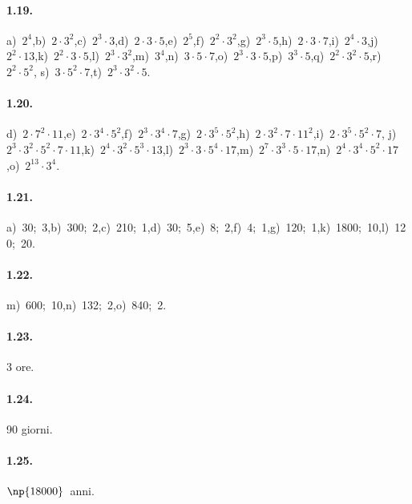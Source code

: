 \paragraph{1.19.}
a)~$2^4$,\quad b)~$ 2\cdot 3^2 $,\quad c)~$ 2^3 \cdot 3 $,\quad d)~$ 2\cdot 3\cdot 5 $,\quad e)~$ 2^5 $,\quad f)~$ 2^2 \cdot 3^2 $,\quad g)~$ 2^3 \cdot 5 $,\quad h)~$ 2\cdot 3\cdot 7 $,\quad i)~$ 2^4 \cdot 3 $,\quad j)~$ 2^2 \cdot 13 $,\quad k)~$ 2^2 \cdot 3 \cdot5 $,\quad l)~$ 2^3 \cdot 3^2 $,\quad m)~$ 3^4 $,\quad n)~$ 3\cdot 5\cdot 7 $,\quad o)~$ 2^3 \cdot 3\cdot 5 $,\quad p)~$ 3^3 \cdot 5 $,\quad q)~$ 2^2 \cdot 3^2 \cdot 5 $,\quad r)~$ 2^2 \cdot 5^2 $, s)~$3\cdot5^2\cdot7$,\quad t)~$ 2^3 \cdot 3^2 \cdot5$.

\paragraph{1.20.}
d)~$2\cdot7^2\cdot11$,\quad e)~$2\cdot3^4\cdot5^2$,\quad f)~$2^3\cdot3^4\cdot7$,\quad g)~$2\cdot3^5\cdot5^2$,\quad h)~$2\cdot3^2\cdot7\cdot11^2$,\quad i)~$2\cdot3^5\cdot5^2\cdot7$,\quad
j)~$2^3\cdot3^2\cdot5^2\cdot7\cdot11$,\quad k)~$2^4\cdot3^2\cdot5^3\cdot13$,\quad l)~$2^3\cdot3\cdot5^4\cdot17$,\quad m)~$2^7\cdot3^3\cdot5\cdot17$,\quad n)~$2^4\cdot3^4\cdot5^2\cdot17$,\quad o)~$2^{13}\cdot3^4$.

\paragraph{1.21.}
a)~30;~3,\quad b)~300;~2,\quad c)~210;~1,\quad d)~30;~5,\quad e)~8;~2,\quad f)~4;~1,\quad g)~120;~1,\quad k)~1800;~10,\quad l)~120;~20.

\paragraph{1.22.}
m)~600;~10,\quad n)~132;~2,\quad o)~840;~2.

\begin{multicols}{3}
\paragraph{1.23.}
3 ore.

\paragraph{1.24.}
90 giorni.

\paragraph{1.25.}
$ \np{18000}$~anni.
\end{multicols}

